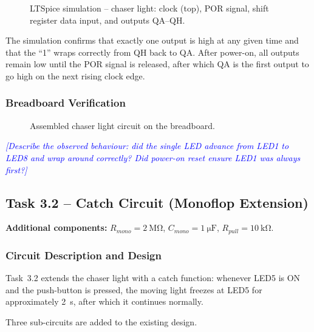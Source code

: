 \documentclass[12pt, a4paper]{article}
\newcommand{\enter}[1]{\textcolor{blue}{\textit{[#1]}}}
\begin{document}
\begin{figure}[H]
  \centering
  \caption{LTSpice simulation -- chaser light: clock (top), POR signal,
           shift register data input, and outputs QA--QH.}
  \label{fig:sim_chaser}
\end{figure}

The simulation confirms that exactly one output is high at any given time and that
the ``1'' wraps correctly from QH back to QA.
After power-on, all outputs remain low until the POR signal is released, after which
QA is the first output to go high on the next rising clock edge.

\subsubsection{Breadboard Verification}

\begin{figure}[H]
  \centering
  \caption{Assembled chaser light circuit on the breadboard.}
  \label{fig:board_chaser}
\end{figure}

\enter{Describe the observed behaviour: did the single LED advance from LED1 to LED8
and wrap around correctly? Did power-on reset ensure LED1 was always first?}

\subsection{Task 3.2 -- Catch Circuit (Monoflop Extension)}

\textbf{Additional components:}
$R_{mono} = \SI{2}{\mega\ohm}$,\quad
$C_{mono} = \SI{1}{\micro\farad}$,\quad
$R_{pull} = \SI{10}{\kilo\ohm}$.

\subsubsection{Circuit Description and Design}

Task~3.2 extends the chaser light with a catch function: whenever LED5 is ON and
the push-button is pressed, the moving light freezes at LED5 for approximately
\SI{2}{\second}, after which it continues normally.

Three sub-circuits are added to the existing design.
\end{document}
